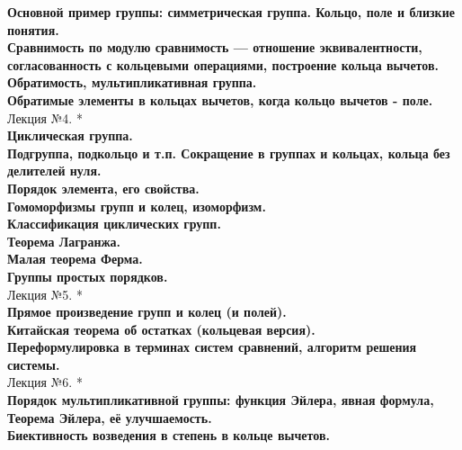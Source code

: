 \documentclass[12pt]{article}
\begin{document}
\textbf{Основной пример группы: симметрическая группа. Кольцо, поле и близкие понятия.}\\

\textbf{Сравнимость по модулю сравнимость — отношение эквивалентности, согласованность с кольцевыми операциями, построение кольца вычетов.}\\

\textbf{Обратимость, мультипликативная группа.}\\

\textbf{Обратимые элементы в кольцах вычетов, когда кольцо вычетов - поле.}\\

Лекция №4. *\\
\textbf{Циклическая группа.}\\

\textbf{Подгруппа, подкольцо и т.п. Сокращение в группах и кольцах, кольца без делителей нуля.}\\

\textbf{Порядок элемента, его свойства.}\\

\textbf{Гомоморфизмы групп и колец, изоморфизм.}\\

\textbf{Классификация циклических групп.}\\

\textbf{Теорема Лагранжа.}\\

\textbf{Малая теорема Ферма.}\\

\textbf{Группы простых порядков.}\\

Лекция №5. *\\
\textbf{Прямое произведение групп и колец (и полей).}\\

\textbf{Китайская теорема об остатках (кольцевая версия).}\\

\textbf{Переформулировка в терминах систем сравнений, алгоритм решения системы.}\\

Лекция №6. *\\
\textbf{Порядок мультипликативной группы: функция Эйлера, явная формула, Теорема Эйлера, её улучшаемость.}\\

\textbf{Биективность возведения в степень в кольце вычетов.}\\
\end{document}

